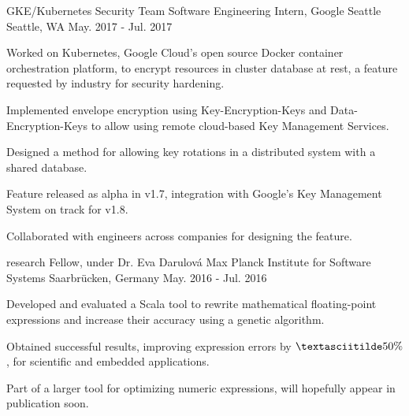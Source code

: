 
\vspace{-0.2cm}


\begin{cventries}


  \cventry
  {GKE/Kubernetes Security Team}
  {Software Engineering Intern, Google Seattle}
  {Seattle, WA}
  {May. 2017 - Jul. 2017}
  {
    \begin{cvitems}
    \item {Worked on Kubernetes, Google Cloud's open source Docker container orchestration platform, to encrypt resources in cluster database at rest, a feature requested by industry for security hardening.}
    \item {Implemented envelope encryption using Key-Encryption-Keys and Data-Encryption-Keys to allow using remote cloud-based Key Management Services.}
    \item {Designed a method for allowing key rotations in a distributed system with a shared database.}
    \item {Feature released as alpha in v1.7, integration with Google's Key Management System on track for v1.8.}
    \item {Collaborated with engineers across companies for designing the feature.}
    \end{cvitems}
  }

  \cventry
  {research Fellow, under Dr. Eva Darulová} %
  {Max Planck Institute for Software Systems} %
  {Saarbrücken, Germany} %
  {May. 2016 - Jul. 2016} %
  {
    \begin{cvitems}
    \item {Developed and evaluated a Scala tool to rewrite
    mathematical floating-point expressions and increase their
    accuracy using a genetic algorithm.}
    \item {Obtained successful results, improving expression errors by
    $\textasciitilde50\%$, for scientific and embedded
    applications.}
    \item {Part of a larger tool for optimizing numeric expressions,
        will hopefully appear in publication soon.}
    \end{cvitems}
  }


\end{cventries}
